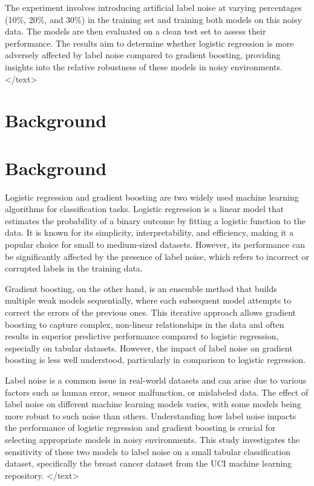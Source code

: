\documentclass{article}
\begin{document}
The experiment involves introducing artificial label noise at varying percentages (10\%, 20\%, and 30\%) in the training set and training both models on this noisy data. The models are then evaluated on a clean test set to assess their performance. The results aim to determine whether logistic regression is more adversely affected by label noise compared to gradient boosting, providing insights into the relative robustness of these models in noisy environments.
</text>
\section{Background}
\section{Background}

Logistic regression and gradient boosting are two widely used machine learning algorithms for classification tasks. Logistic regression is a linear model that estimates the probability of a binary outcome by fitting a logistic function to the data. It is known for its simplicity, interpretability, and efficiency, making it a popular choice for small to medium-sized datasets. However, its performance can be significantly affected by the presence of label noise, which refers to incorrect or corrupted labels in the training data.

Gradient boosting, on the other hand, is an ensemble method that builds multiple weak models sequentially, where each subsequent model attempts to correct the errors of the previous ones. This iterative approach allows gradient boosting to capture complex, non-linear relationships in the data and often results in superior predictive performance compared to logistic regression, especially on tabular datasets. However, the impact of label noise on gradient boosting is less well understood, particularly in comparison to logistic regression.

Label noise is a common issue in real-world datasets and can arise due to various factors such as human error, sensor malfunction, or mislabeled data. The effect of label noise on different machine learning models varies, with some models being more robust to such noise than others. Understanding how label noise impacts the performance of logistic regression and gradient boosting is crucial for selecting appropriate models in noisy environments. This study investigates the sensitivity of these two models to label noise on a small tabular classification dataset, specifically the breast cancer dataset from the UCI machine learning repository.
</text>
\end{document}
